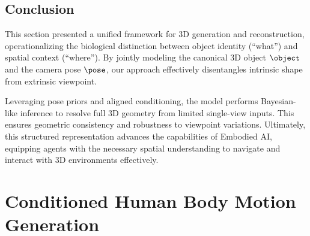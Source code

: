 \documentclass[../../book-main.tex]{subfiles}
\begin{document}
\subsection{Conclusion}
This section presented a unified framework for 3D generation and
reconstruction, operationalizing the biological distinction between
object identity (``what'') and spatial context (``where''). By
jointly modeling the canonical 3D object $\object$ and the camera
pose $\pose$, our approach effectively disentangles intrinsic shape
from extrinsic viewpoint.

Leveraging pose priors and aligned conditioning, the model performs
Bayesian-like inference to resolve full 3D geometry from limited
single-view inputs. This ensures geometric consistency and robustness
to viewpoint variations. Ultimately, this structured representation
advances the capabilities of Embodied AI, equipping agents with the
necessary spatial understanding to navigate and interact with 3D
environments effectively.

\section{Conditioned Human Body Motion Generation}
\label{sec:egoallo}

%
\end{document}
